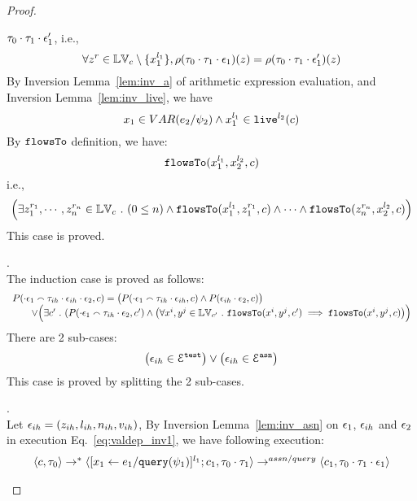 \begin{proof}
\begin{case}[$\trace_2 = \cdot$]
$\mathtt{\tau}_0 \cdot \mathtt{\tau}_1 \cdot \mathtt{\epsilon}_1'$, i.e.,
\[
  \forall z^r \in \mathbb{LV}_c \setminus \{x_1^{l_1}\} ,
  \rho(\mathtt{\tau}_0 \cdot \mathtt{\tau}_1 \cdot \mathtt{\epsilon}_1) (z) =  
  \rho(\mathtt{\tau}_0 \cdot \mathtt{\tau}_1 \cdot \mathtt{\epsilon}_1') (z)
\]
%
By {Inversion Lemma~\ref{lem:inv_a}} of arithmetic expression evaluation, and Inversion Lemma~\ref{lem:inv_live}, we have 
\[
  x_1 \in VAR(e_2 / \psi_2) 
  \land x_1^{l_1} \in \mathtt{live}^{l_2}(c)
\]
%
By $\mathtt{flowsTo}$ definition, we have:
%
\[
\mathtt{flowsTo}(x_1^{l_1}, {x}_2^{l_2}, c)
\]
i.e.,
%
\[
\Big(\exists z_1^{r_1}, \cdots, z_n^{r_n} \in \mathbb{LV}_{{c}} ~.~ (0 \leq n )
 \land \mathtt{flowsTo}(x_1^{l_1}, z_1^{r_1}, c) \land \cdots \land \mathtt{flowsTo}(z_n^{r_n}, {x}_2^{l_2}, c) \Big)
 \]
%
This case is proved.
\end{case}
%
\begin{case}[$\trace_2 = \trace_{ih} \cdot \event_{ih}$]
\label{case:valdep_ih}.
\\
%
The induction case is proved as follows:
 $$
   \begin{array}{l}
P(\cdot \mathtt{\epsilon}_1 \smallfrown \mathtt{\tau}_{ih} \cdot \mathtt{\epsilon}_{ih} \cdot \mathtt{\epsilon}_2, c)
 = 
 \big(P(\cdot \mathtt{\epsilon}_1 \smallfrown \mathtt{\tau}_{ih} \cdot \mathtt{\epsilon}_{ih}, c) \land P(\mathtt{\epsilon}_{ih} \cdot \mathtt{\epsilon}_2, c)\big) 
  \\ \qquad \lor 
 \Big(\exists c' ~.~ (P(\cdot \mathtt{\epsilon}_1 \smallfrown \mathtt{\tau}_{ih} \cdot \mathtt{\epsilon}_2, c') 
 \land 
 \big(\forall x^i, y^j \in \mathbb{LV}_{c'} ~.~ \mathtt{flowsTo}(x^i, y^j, c') \implies \mathtt{flowsTo}(x^i, y^j , c) \big)\Big)
 \end{array}
  $$
There are 2 sub-cases: 
%
 \[
 \big(\mathtt{\epsilon}_{ih} \in \mathcal{E}^{\mathtt{{test}}}\big) \lor \big(\mathtt{\epsilon}_{ih} \in \mathcal{E}^{\mathtt{{asn}}}\big)
 \]
%
This case is proved by splitting the 2 sub-cases.
%
\begin{subcase}.
\label{case:valdep_ihasn}
%
\\
Let $\mathtt{\epsilon}_{ih} = (z_{ih}, l_{ih}, n_{ih}, v_{ih})$, 
%
By Inversion Lemma~\ref{lem:inv_asn} on $\mathtt{\epsilon}_1$, $\mathtt{\epsilon}_{ih}$ and $\mathtt{\epsilon}_2$ in execution Eq.~\ref{eq:valdep_inv1}, we have following execution:
\begin{equation}
\label{eq:m1asn_inv1}
  \begin{array}{l}   
\langle {c}, \mathtt{\tau}_0 \rangle \rightarrow^{*} 
\langle [\mathrel{ {x}_1 \leftarrow e_1 / {\tt query}(\psi_1) }]^{l_1} ; {c}_1, \mathtt{\tau}_0 \cdot \mathtt{\tau}_1 \rangle  \rightarrow^{assn/query}
 \langle c_1, \mathtt{\tau}_0 \cdot \mathtt{\tau}_1 \cdot \mathtt{\epsilon}_1 \rangle \\

\end{array}
\end{equation}
\end{subcase}
\end{case}
\end{proof}
